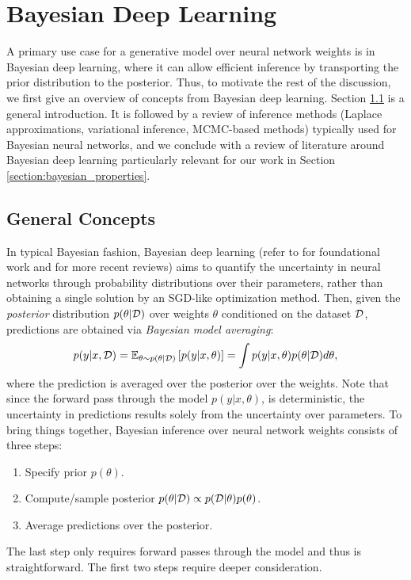 
\chapter{Bayesian Deep Learning}\label{section:bayesian_dl}

A primary use case for a generative model over neural network weights is in Bayesian deep learning, where it can allow efficient inference by transporting the prior distribution to the posterior. Thus, to motivate the rest of the discussion, we first give an overview of concepts from Bayesian deep learning. Section \ref{section:bayesian_concepts} is a general introduction. It is followed by a review of inference methods (Laplace approximations, variational inference, MCMC-based methods) typically used for Bayesian neural networks, and we conclude with a review of literature around Bayesian deep learning particularly relevant for our work in Section \ref{section:bayesian_properties}.

\section{General Concepts} \label{section:bayesian_concepts}

In typical Bayesian fashion, Bayesian deep learning (refer to \citep{mackayBayesianMethodsAdaptive1992, nealBayesianLearningNeural1996} for foundational work and \citep{goanBayesianNeuralNetworks2020,arbelPrimerBayesianNeural2023} for more recent reviews) aims to quantify the uncertainty in neural networks through probability distributions over their parameters, rather than obtaining a single solution by an SGD-like optimization method. Then, given the \textit{posterior} distribution $p(\theta \vert \mathcal{D})$ over weights $\theta$ conditioned on the dataset $\mathcal{D}$, predictions are obtained via \textit{Bayesian model averaging}:
\begin{equation}
    p(y \vert x, \mathcal{D}) 
    = \mathbb{E}_{\theta \sim p(\theta \vert \mathcal{D})} \left[ p(y\vert x, \theta) \right]
    = \int p(y \vert x, \theta) p(\theta \vert \mathcal{D}) d\theta,
\end{equation}
where the prediction is averaged over the posterior over the weights. Note that since the forward pass through the model $p(y \vert x, \theta)$, is deterministic, the uncertainty in predictions results solely from the uncertainty over parameters. To bring things together, Bayesian inference over neural network weights consists of three steps:
\begin{enumerate}
    \item Specify prior $p(\theta)$.
    \item Compute/sample posterior $p(\theta \vert \mathcal{D}) \propto p(\mathcal{D} \vert \theta) p(\theta)$.
    \item Average predictions over the posterior. 
\end{enumerate}
The last step only requires forward passes through the model and thus is straightforward. The first two steps require deeper consideration. 

